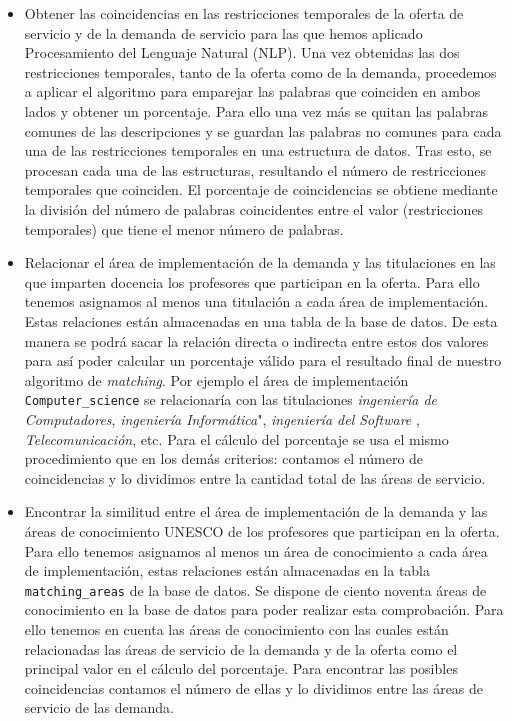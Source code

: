 \documentclass[11pt]{book}
\begin{document}
\begin{itemize}
	\item Obtener las coincidencias en las restricciones temporales de la oferta de servicio y de la demanda de servicio para las que hemos aplicado Procesamiento del Lenguaje Natural (NLP). Una vez obtenidas las dos restricciones temporales, tanto de la oferta como de la demanda, procedemos a aplicar el algoritmo para emparejar las palabras que coinciden en ambos lados y obtener un porcentaje. Para ello una vez más se quitan las palabras comunes de las descripciones y se guardan las palabras no comunes para cada una de las restricciones temporales en una estructura de datos. Tras esto, se procesan cada una de las estructuras, resultando el número de restricciones temporales que coinciden. El porcentaje de coincidencias se obtiene mediante la división del número de palabras coincidentes entre el valor (restricciones temporales) que tiene el menor número de palabras.
	
	\item Relacionar el área de implementación de la demanda y las titulaciones en las que imparten docencia los profesores que participan en la oferta. Para ello tenemos asignamos al menos una titulación a cada área de implementación. Estas relaciones están almacenadas en una tabla de la base de datos. De esta manera se podrá sacar la relación directa o indirecta entre estos dos valores para así poder calcular un porcentaje válido para el resultado final de nuestro algoritmo de \emph{matching}. Por ejemplo el área de implementación \texttt{Computer\_science} se relacionaría con las titulaciones \emph{ingeniería de Computadores}, \emph{ingeniería Informática}", \emph{ingeniería del Software} , \emph{Telecomunicación}, etc. Para el cálculo del porcentaje se usa el mismo procedimiento que en los demás criterios: contamos el número de coincidencias y lo dividimos entre la cantidad total de las áreas de servicio.
	
	\item Encontrar la similitud entre el área de implementación de la demanda y las áreas de conocimiento UNESCO de los profesores que participan en la oferta. Para ello tenemos asignamos al menos un área de conocimiento a cada área de implementación, estas relaciones están almacenadas en la tabla \texttt{matching\_areas} de la base de datos. Se dispone de ciento noventa áreas de conocimiento en la base de datos para poder realizar esta comprobación. Para ello tenemos en cuenta las áreas de conocimiento con las cuales están relacionadas las áreas de servicio de la demanda y de la oferta como el principal valor en el cálculo del porcentaje. Para encontrar las posibles coincidencias contamos el número de ellas y lo dividimos entre las áreas de servicio de las demanda.
\end{itemize}
\end{document}

